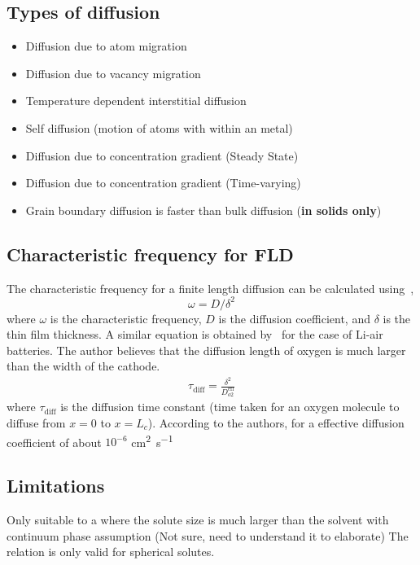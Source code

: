 \documentclass[12pt]{book}
\begin{document}
\subsection{Types of diffusion}
\begin{itemize}
\item Diffusion due to atom migration
\item Diffusion due to vacancy migration
\item Temperature dependent interstitial diffusion 
\item Self diffusion (motion of atoms with within an metal)
\item Diffusion due to concentration gradient (Steady State)
\item Diffusion due to concentration gradient (Time-varying)
\item Grain boundary diffusion is faster than bulk diffusion (\textbf{in solids only})
\end{itemize}

\subsection{Characteristic frequency for FLD}
The characteristic frequency for a finite length diffusion can be calculated using~\cite{Springer1989},
\begin{equation}
\omega = D/\delta^2
\end{equation}
where $\omega$ is the characteristic frequency, $D$ is the diffusion coefficient, and $\delta$ is the thin film thickness.
A similar equation is obtained by~\cite{Wang2013c} for the case of Li-air batteries. The author believes that the diffusion length of oxygen is much larger than the  width of the cathode. 
\begin{align}
\tau_{\textrm{diff}}  = \frac{\delta^2}{D_{o2}^\textrm{eff}}
\end{align}
where $\tau_{\textrm{diff}}$ is the diffusion time constant (time taken for an oxygen molecule to diffuse from $x=0$ to $x = L_c$). According to the authors, for a effective diffusion coefficient of about $10^{-6}$ \si{\centi\metre\squared\per\second}

\subsection{Limitations}
Only suitable to a where the solute size is much larger than the solvent with continuum phase assumption (Not sure, need to understand it to elaborate)\cite{Lee2002}
The relation is only valid for spherical solutes.
\end{document}
